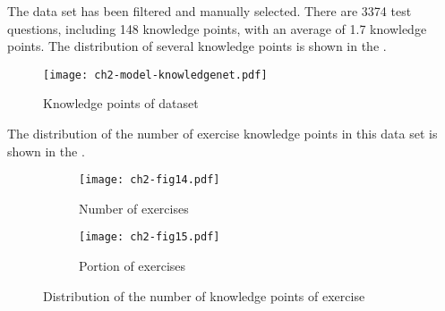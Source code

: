 The data set has been filtered and manually selected. There are 3374 test questions, including 148 knowledge points, with an average of 1.7 knowledge points. The distribution of several knowledge points is shown in the \figname{\ref{fig:ch2-model-knowledgenet}}.
\begin{figure}[htbp!]
    \centering
    \texttt{[image: ch2-model-knowledgenet.pdf]}
    \caption{Knowledge points of dataset}\label{fig:ch2-model-knowledgenet}
\end{figure}

The distribution of the number of exercise knowledge points in this data set is shown in the \figname{\ref{ch2-fig14}}.
\begin{figure}[htbp!]
    \centering
    \begin{subfigure}[b]{0.475\textwidth}
        \texttt{[image: ch2-fig14.pdf]}
        \caption[dis]{Number of exercises}\label{fig:ch2-fig14-hist}
    \end{subfigure}
    \begin{subfigure}[b]{0.475\textwidth}
        \texttt{[image: ch2-fig15.pdf]}
        \caption{Portion of exercises}\label{fig:ch2-fig14-pie}
    \end{subfigure}
    \caption{Distribution of the number of knowledge points of exercise}\label{ch2-fig14}
\end{figure}


